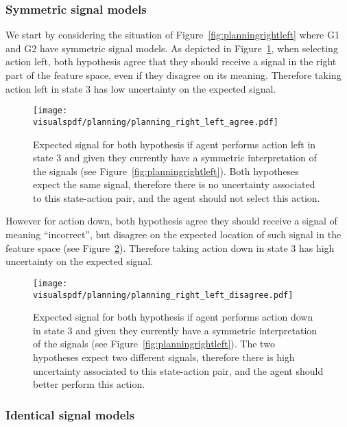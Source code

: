 \subsubsection*{Symmetric signal models}

We start by considering the situation of Figure~\ref{fig:planningrightleft} where G1 and G2 have symmetric signal models. As depicted in Figure~\ref{fig:uncertaintysignalrightleftagree}, when selecting action left, both hypothesis agree that they should receive a signal in the right part of the feature space, even if they disagree on its meaning. Therefore taking action left in state 3 has low uncertainty on the expected signal.

\begin{figure}[!htbp]
  \centering
  \texttt{[image: \\visualspdf/planning/planning\_right\_left\_agree.pdf]}
  \caption{Expected signal for both hypothesis if agent performs action left in state 3 and given they currently have a symmetric interpretation of the signals (see Figure~\ref{fig:planningrightleft}). Both hypotheses expect the same signal, therefore there is no uncertainty associated to this state-action pair, and the agent should not select this action.}
  \label{fig:uncertaintysignalrightleftagree}
\end{figure}

However for action down, both hypothesis agree they should receive a signal of meaning ``incorrect'', but disagree on the expected location of such signal in the feature space (see Figure~\ref{fig:uncertaintysignalrightleftdisagree}). Therefore taking action down in state 3 has high uncertainty on the expected signal.

\begin{figure}[!htbp]
  \centering
  \texttt{[image: \\visualspdf/planning/planning\_right\_left\_disagree.pdf]}
  \caption{Expected signal for both hypothesis if agent performs action down in state 3 and given they currently have a symmetric interpretation of the signals (see Figure~\ref{fig:planningrightleft}). The two hypotheses expect two different signals, therefore there is high uncertainty associated to this state-action pair, and the agent should better perform this action.}
  \label{fig:uncertaintysignalrightleftdisagree}
\end{figure}

\subsubsection*{Identical signal models}

